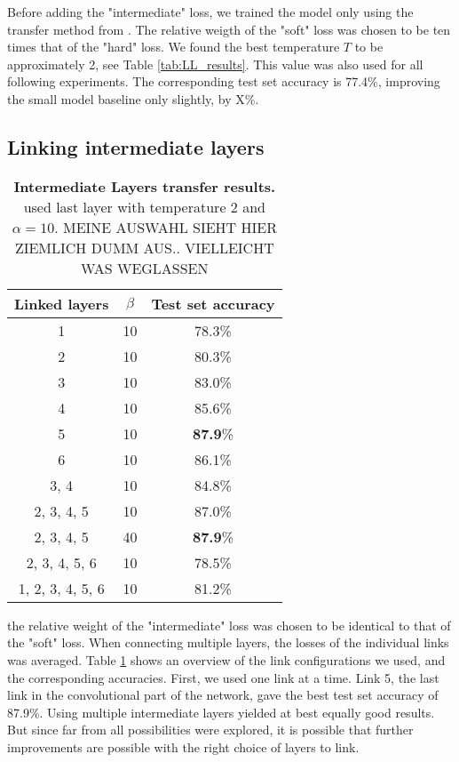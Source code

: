 \documentclass[10pt,twocolumn,letterpaper]{article}
\begin{document}
Before adding the "intermediate" loss, we trained the model only using the transfer method from \cite{hinton2015distilling}. The relative weigth of the "soft" loss was chosen to be ten times that of the "hard" loss. We found the best temperature $ T $ to be approximately 2, see Table \ref{tab:LL_results}. This value was also used for all following experiments. The corresponding test set accuracy is 77.4\%, improving the small model baseline only slightly, by X\%.


\subsection{Linking intermediate layers}
\begin{table}[]
	\begin{center}
	\begin{tabular}{|c|c|c|}
		\hline
		Linked layers	&	$\beta$	&	Test set accuracy\\ \hline
		1	&	10	&	78.3\%	\\ \hline
		2	&	10	&	80.3\%	\\ \hline
		3	&	10	&	83.0\%	\\ \hline
		4	&	10	&	85.6\%	\\ \hline
		5	&	10	&	\textbf{87.9}\%	\\ \hline
		6	&	10	&	86.1\%	\\ \hline
		3, 4	&	10	&	84.8\%	\\ \hline
		2, 3, 4, 5	&	10	&	87.0\%	\\ \hline
		2, 3, 4, 5	&	40	&	\textbf{87.9}\%	\\ \hline
		2, 3, 4, 5, 6	&	10	&	78.5\%	\\ \hline
		1, 2, 3, 4, 5, 6	&	10	&	81.2\%	\\ \hline
	\end{tabular}
	\end{center}
	\caption{\textbf{Intermediate Layers transfer results.} used last layer with temperature 2 and $ \alpha = 10 $. MEINE AUSWAHL SIEHT HIER ZIEMLICH DUMM AUS.. VIELLEICHT WAS WEGLASSEN}
	\label{tab:interemediate_results}
\end{table}
the relative weight of the "intermediate" loss was chosen to be identical to that of the "soft" loss. When connecting multiple layers, the losses of the individual links was averaged. Table \ref{tab:interemediate_results} shows an overview of the link configurations we used, and the corresponding accuracies. First, we used one link at a time. Link 5, the last link in the convolutional part of the network, gave the best test set accuracy of 87.9\%. Using multiple intermediate layers yielded at best equally good results. But since far from all possibilities were explored, it is possible that further improvements are possible with the right choice of layers to link.
\end{document}
